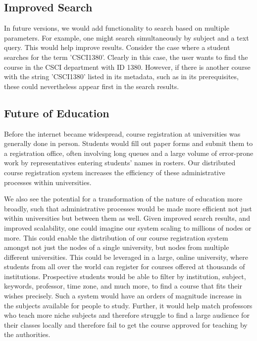 \documentclass[sigplan, screen, 10pt]{acmart}
\begin{document}
\subsection{Improved Search}
In future versions, we would add functionality to search based on multiple parameters. For example, one might search simultaneously by subject and a text query. This would help improve results. Consider the case where a student searches for the term 'CSCI1380'. Clearly in this case, the user wants to find the course in the CSCI department with ID 1380. However, if there is another course with the string 'CSCI1380' listed in its metadata, such as in its prerequisites, these could nevertheless appear first in the search results.

\subsection{Future of Education}
Before the internet became widespread, course registration at universities was generally done in person. Students would fill out paper forms and submit them to a registration office, often involving long queues and a large volume of error-prone work by representatives entering students' names in rosters. Our distributed course registration system increases the efficiency of these administrative processes within universities.

We also see the potential for a transformation of the nature of education more broadly, such that administrative processes would be made more efficient not just within universities but between them as well. Given improved search results, and improved scalability, one could imagine our system scaling to millions of nodes or more. This could enable the distribution of our course registration system amongst not just the nodes of a single university, but nodes from multiple different universities. This could be leveraged in a large, online university, where students from all over the world can register for courses offered at thousands of institutions. Prospective students would be able to filter by institution, subject, keywords, professor, time zone, and much more, to find a course that fits their wishes precisely. Such a system would have an orders of magnitude increase in the subjects available for people to study. Further, it would help match professors who teach more niche subjects and therefore struggle to find a large audience for their classes locally and therefore fail to get the course approved for teaching by the authorities.
\end{document}
